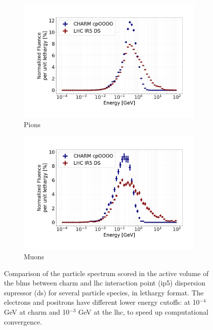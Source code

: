 \documentclass[encoding=utf8,british]{tumphthesis}
\begin{document}
\begin{figure}
\begin{subfigure}{0.49\textwidth}
  \includegraphics[width=\linewidth]{figures/pion_y_linear.png}
  \caption{Pions}
  \label{fig:BLM-spectrum-pions}
\end{subfigure}%
\begin{subfigure}{0.49\textwidth}
  \includegraphics[width=\linewidth]{figures/muon_y_linear.png}
  \caption{Muons}
  \label{fig:BLM-spectrum-muons}
\end{subfigure}

\caption{Comparison of the particle spectrum scored in the active volume of the \acrshort{blm}s between \acrshort{charm} and \acrshort{lhc} interaction point (\acrshort{ip}5) dispersion supressor (\acrshort{ds}) for several particle species, in lethargy format. The electrons and positrons have different lower energy cutoffs: at 10$^{-4}$ GeV at \acrshort{charm} and 10$^{-3}$ GeV at the \acrshort{lhc}, to speed up computational convergence.}
\label{fig:BLM-spectrum}
\end{figure}
\end{document}
